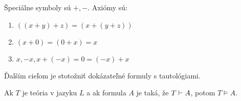 \begin{priklad}
    Špeciálne symboly sú $+,-$.
    Axiómy sú:
    \begin{enumerate}
            \item $((x+y)+z) = (x+(y+z))$
            \item $(x+0) = (0+x) = x$
            \item $x, -x, x+(-x) = 0 = (-x)+x$
    \end{enumerate}
\end{priklad}

Ďalším cieľom je stotožniť dokázateľné formuly s tautológiami.

\begin{veta}[o korektnosti]
    Ak $T$ je teória v jazyku $L$ a ak formula $A$ je taká,
    že $T \vdash A$, potom $T \models A$.
\end{veta}

